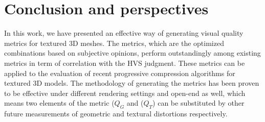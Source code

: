 \section{Conclusion and perspectives}
In this work, we have presented an effective way of generating visual quality metrics for textured 3D meshes. The metrics, which are the optimized combinations based on subjective opinions, perform outstandingly among existing metrics in term of correlation with the HVS judgment.  These metrics can be applied to the evaluation of recent progressive compression algorithms for textured 3D models. The methodology of generating the metrics has been proven to be effective under different rendering settings and open-end as well, which means two elements of the metric ($Q_G$ and ($Q_T$) can be substituted by other future measurements of geometric and textural distortions respectively.  \\
